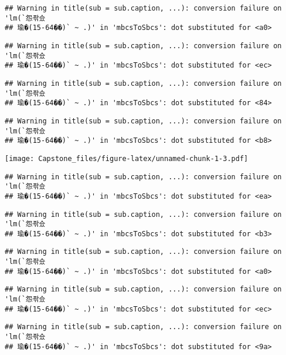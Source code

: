 \documentclass[]{article}
\begin{document}
\begin{verbatim}
## Warning in title(sub = sub.caption, ...): conversion failure on 'lm(`怨좎슜
## 瑜�(15-64��)` ~ .)' in 'mbcsToSbcs': dot substituted for <a0>
\end{verbatim}

\begin{verbatim}
## Warning in title(sub = sub.caption, ...): conversion failure on 'lm(`怨좎슜
## 瑜�(15-64��)` ~ .)' in 'mbcsToSbcs': dot substituted for <ec>
\end{verbatim}

\begin{verbatim}
## Warning in title(sub = sub.caption, ...): conversion failure on 'lm(`怨좎슜
## 瑜�(15-64��)` ~ .)' in 'mbcsToSbcs': dot substituted for <84>
\end{verbatim}

\begin{verbatim}
## Warning in title(sub = sub.caption, ...): conversion failure on 'lm(`怨좎슜
## 瑜�(15-64��)` ~ .)' in 'mbcsToSbcs': dot substituted for <b8>
\end{verbatim}

\texttt{[image: Capstone\_files/figure-latex/unnamed-chunk-1-3.pdf]}

\begin{verbatim}
## Warning in title(sub = sub.caption, ...): conversion failure on 'lm(`怨좎슜
## 瑜�(15-64��)` ~ .)' in 'mbcsToSbcs': dot substituted for <ea>
\end{verbatim}

\begin{verbatim}
## Warning in title(sub = sub.caption, ...): conversion failure on 'lm(`怨좎슜
## 瑜�(15-64��)` ~ .)' in 'mbcsToSbcs': dot substituted for <b3>
\end{verbatim}

\begin{verbatim}
## Warning in title(sub = sub.caption, ...): conversion failure on 'lm(`怨좎슜
## 瑜�(15-64��)` ~ .)' in 'mbcsToSbcs': dot substituted for <a0>
\end{verbatim}

\begin{verbatim}
## Warning in title(sub = sub.caption, ...): conversion failure on 'lm(`怨좎슜
## 瑜�(15-64��)` ~ .)' in 'mbcsToSbcs': dot substituted for <ec>
\end{verbatim}

\begin{verbatim}
## Warning in title(sub = sub.caption, ...): conversion failure on 'lm(`怨좎슜
## 瑜�(15-64��)` ~ .)' in 'mbcsToSbcs': dot substituted for <9a>
\end{verbatim}
\end{document}
